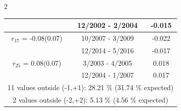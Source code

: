 \begin{multicols}{2}
{\begin{tabular}{ccc}
  &       12/2002 -  2/2004 &       -0.015  \vspace{-.02in}   \\ \hline 
    $r_{17}$ = -0.08(0.07) &      10/2007 -  3/2009 &       -0.022    \vspace{-.10in} \\ 
  &       12/2014 -  5/2016 &       -0.017  \vspace{-.02in}   \\ \hline 
    $r_{25}$ = 0.08(0.07) &       3/2003 -  4/2005 &        0.018   \vspace{-.10in} \\  
&       12/2004 -  1/2007 &        0.017  \vspace{-.02in} \\ \hline 
\multicolumn{3}{c}{              11 values outside (-1,+1): 28.21  \% (31.74  \% expected)}\vspace{-.10in} \\ 
\multicolumn{3}{c}{               2 values outside (-2,+2):  5.13 \%  (4.56 \% expected) } \\
 \end{tabular} \\ 
 } 
\end{multicols} 
